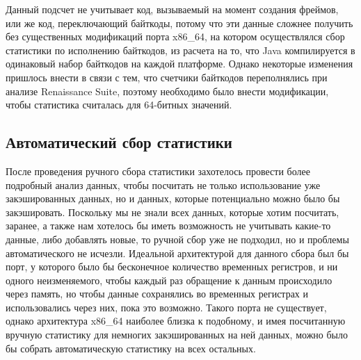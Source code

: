 Данный подсчет не учитывает код, вызываемый на момент создания фреймов, или же код, переключающий байткоды, потому что эти данные сложнее получить без существенных модификаций порта x86\_64, на котором осуществлялся сбор статистики по исполнению байткодов, из расчета на то, что Java компилируется в одинаковый набор байткодов на каждой платформе. Однако некоторые изменения пришлось внести в связи с тем, что счетчики байткодов переполнялись при анализе Renaissance Suite, поэтому необходимо было внести модификации, чтобы статистика считалась для 64-битных значений.



\subsection{Автоматический сбор статистики}

После проведения ручного сбора статистики захотелось провести более подробный анализ данных, чтобы посчитать не только использование уже закэшированных данных, но и данных, которые потенциально можно было бы закэшировать. Поскольку мы не знали всех данных, которые хотим посчитать, заранее, а также нам хотелось бы иметь возможность не учитывать какие-то данные, либо добавлять новые, то ручной сбор уже не подходил, но и проблемы автоматического не исчезли. Идеальной архитектурой для данного сбора был бы порт, у которого было бы бесконечное количество временных регистров, и ни одного неизменяемого, чтобы каждый раз обращение к данным происходило через память, но чтобы данные сохранялись во временных регистрах и использовались через них, пока это возможно. Такого порта не существует, однако архитектура x86\_64 наиболее близка к подобному, и имея посчитанную вручную статистику для немногих закэшированных на ней данных, можно было бы собрать автоматическую статистику на всех остальных. 

